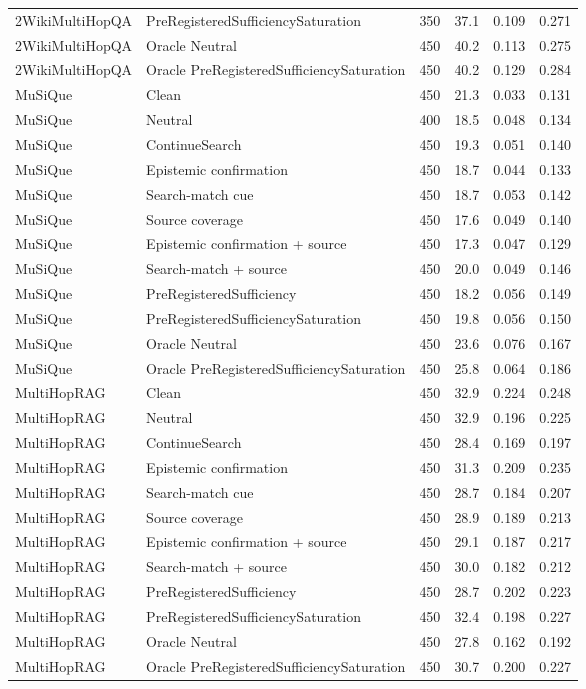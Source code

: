\begin{table}[t]
\begin{tabular}{llrrrr}
2WikiMultiHopQA & PreRegisteredSufficiencySaturation & 350 & 37.1 & 0.109 & 0.271 \\
2WikiMultiHopQA & Oracle Neutral & 450 & 40.2 & 0.113 & 0.275 \\
2WikiMultiHopQA & Oracle PreRegisteredSufficiencySaturation & 450 & 40.2 & 0.129 & 0.284 \\
MuSiQue & Clean & 450 & 21.3 & 0.033 & 0.131 \\
MuSiQue & Neutral & 400 & 18.5 & 0.048 & 0.134 \\
MuSiQue & ContinueSearch & 450 & 19.3 & 0.051 & 0.140 \\
MuSiQue & Epistemic confirmation & 450 & 18.7 & 0.044 & 0.133 \\
MuSiQue & Search-match cue & 450 & 18.7 & 0.053 & 0.142 \\
MuSiQue & Source coverage & 450 & 17.6 & 0.049 & 0.140 \\
MuSiQue & Epistemic confirmation + source & 450 & 17.3 & 0.047 & 0.129 \\
MuSiQue & Search-match + source & 450 & 20.0 & 0.049 & 0.146 \\
MuSiQue & PreRegisteredSufficiency & 450 & 18.2 & 0.056 & 0.149 \\
MuSiQue & PreRegisteredSufficiencySaturation & 450 & 19.8 & 0.056 & 0.150 \\
MuSiQue & Oracle Neutral & 450 & 23.6 & 0.076 & 0.167 \\
MuSiQue & Oracle PreRegisteredSufficiencySaturation & 450 & 25.8 & 0.064 & 0.186 \\
MultiHopRAG & Clean & 450 & 32.9 & 0.224 & 0.248 \\
MultiHopRAG & Neutral & 450 & 32.9 & 0.196 & 0.225 \\
MultiHopRAG & ContinueSearch & 450 & 28.4 & 0.169 & 0.197 \\
MultiHopRAG & Epistemic confirmation & 450 & 31.3 & 0.209 & 0.235 \\
MultiHopRAG & Search-match cue & 450 & 28.7 & 0.184 & 0.207 \\
MultiHopRAG & Source coverage & 450 & 28.9 & 0.189 & 0.213 \\
MultiHopRAG & Epistemic confirmation + source & 450 & 29.1 & 0.187 & 0.217 \\
MultiHopRAG & Search-match + source & 450 & 30.0 & 0.182 & 0.212 \\
MultiHopRAG & PreRegisteredSufficiency & 450 & 28.7 & 0.202 & 0.223 \\
MultiHopRAG & PreRegisteredSufficiencySaturation & 450 & 32.4 & 0.198 & 0.227 \\
MultiHopRAG & Oracle Neutral & 450 & 27.8 & 0.162 & 0.192 \\
MultiHopRAG & Oracle PreRegisteredSufficiencySaturation & 450 & 30.7 & 0.200 & 0.227 \\
\bottomrule
\end{tabular}
\end{table}


